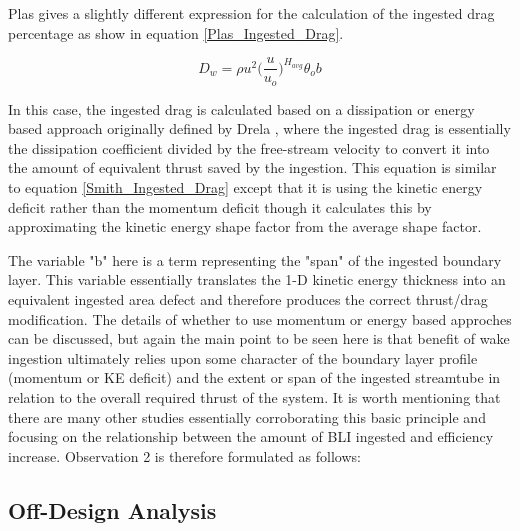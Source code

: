 Plas \cite{Plas2007} gives a slightly different expression for the calculation of the ingested drag percentage as show in equation \ref{Plas_Ingested_Drag}.

\begin{equation}D_w =  \rho u^2 \Big(\frac{u}{u_o}\Big)^{H_{avg}}\theta_o b\label{Plas_Ingested_Drag}\end{equation}%

In this case, the ingested drag is calculated based on a dissipation or energy based approach originally defined by Drela \cite{Drela2009}, where the ingested drag is essentially the dissipation coefficient divided by the free-stream velocity to convert it into the amount of equivalent thrust saved by the ingestion.  This equation is similar to equation \ref{Smith_Ingested_Drag} except that it is using the kinetic energy deficit rather than the momentum deficit though it calculates this by approximating the kinetic energy shape factor from the average shape factor.  

The variable "b" here is a term representing the "span" of the ingested boundary layer.  This variable essentially translates the 1-D kinetic energy thickness into an equivalent ingested area defect and therefore produces the correct thrust/drag modification.  The details of whether to use momentum or energy based approches can be discussed, but again the main point to be seen here is that benefit of wake ingestion ultimately relies upon some character of the boundary layer profile (momentum or KE deficit) and the extent or span of the ingested streamtube in relation to the overall required thrust of the system.  It is worth mentioning that there are many other studies essentially corroborating this basic principle and focusing on the relationship between the amount of BLI ingested and efficiency increase.  Observation 2 is therefore formulated as follows:

\vspace{1pt}
\vspace{5mm}
\vspace{5mm}

\subsection{Off-Design Analysis}
